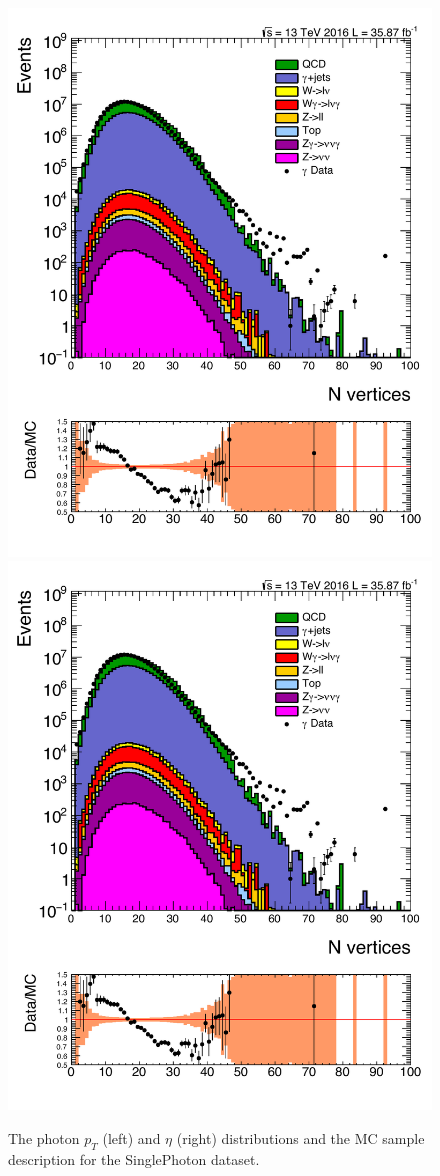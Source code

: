 \begin{figure}[htbp!]
\centering
\includegraphics[width=0.48\linewidth, page=3]{figures/ReMiniAODSummer16HLT_FixXsec_SepProc_PhPtWt_tight_puWeightsummer16_unblind_log_.pdf}
\includegraphics[width=0.48\linewidth, page=5]{figures/ReMiniAODSummer16HLT_FixXsec_SepProc_PhPtWt_tight_puWeightsummer16_unblind_log_.pdf}
\caption{The photon ${p_T}$ (left) and $\eta$ (right) distributions and the MC sample description for the SinglePhoton dataset. }
\label{fig:pho_met}
\end{figure}

